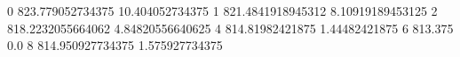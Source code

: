 0 823.779052734375 10.404052734375
1 821.4841918945312 8.10919189453125
2 818.2232055664062 4.84820556640625
4 814.81982421875 1.44482421875
6 813.375 0.0
8 814.950927734375 1.575927734375
